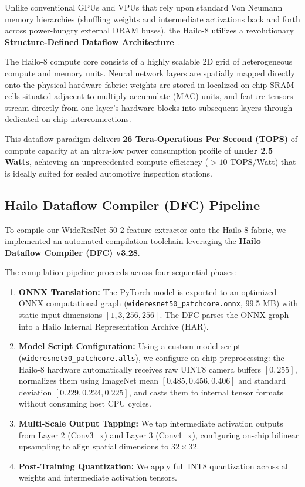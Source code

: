 \documentclass[journal,twocolumn]{IEEEtran}
\begin{document}
Unlike conventional GPUs and VPUs that rely upon standard Von Neumann memory hierarchies (shuffling weights and intermediate activations back and forth across power-hungry external DRAM buses), the Hailo-8 utilizes a revolutionary \textbf{Structure-Defined Dataflow Architecture}~\cite{hailo2023whitepaper}.

The Hailo-8 compute core consists of a highly scalable 2D grid of heterogeneous compute and memory units. Neural network layers are spatially mapped directly onto the physical hardware fabric: weights are stored in localized on-chip SRAM cells situated adjacent to multiply-accumulate (MAC) units, and feature tensors stream directly from one layer's hardware blocks into subsequent layers through dedicated on-chip interconnections.

This dataflow paradigm delivers \textbf{26 Tera-Operations Per Second (TOPS)} of compute capacity at an ultra-low power consumption profile of \textbf{under 2.5 Watts}, achieving an unprecedented compute efficiency ($>10$ TOPS/Watt) that is ideally suited for sealed automotive inspection stations.

\subsection{Hailo Dataflow Compiler (DFC) Pipeline}
To compile our WideResNet-50-2 feature extractor onto the Hailo-8 fabric, we implemented an automated compilation toolchain leveraging the \textbf{Hailo Dataflow Compiler (DFC) v3.28}.

The compilation pipeline proceeds across four sequential phases:
\begin{enumerate}
    \item \textbf{ONNX Translation:} The PyTorch model is exported to an optimized ONNX computational graph (\texttt{wideresnet50\_patchcore.onnx}, 99.5 MB) with static input dimensions $[1, 3, 256, 256]$. The DFC parses the ONNX graph into a Hailo Internal Representation Archive (HAR).
    \item \textbf{Model Script Configuration:} Using a custom model script (\texttt{wideresnet50\_patchcore.alls}), we configure on-chip preprocessing: the Hailo-8 hardware automatically receives raw UINT8 camera buffers $[0, 255]$, normalizes them using ImageNet mean $[0.485, 0.456, 0.406]$ and standard deviation $[0.229, 0.224, 0.225]$, and casts them to internal tensor formats without consuming host CPU cycles.
    \item \textbf{Multi-Scale Output Tapping:} We tap intermediate activation outputs from Layer 2 (Conv3\_x) and Layer 3 (Conv4\_x), configuring on-chip bilinear upsampling to align spatial dimensions to $32 \times 32$.
    \item \textbf{Post-Training Quantization:} We apply full INT8 quantization across all weights and intermediate activation tensors.
\end{enumerate}
\end{document}
